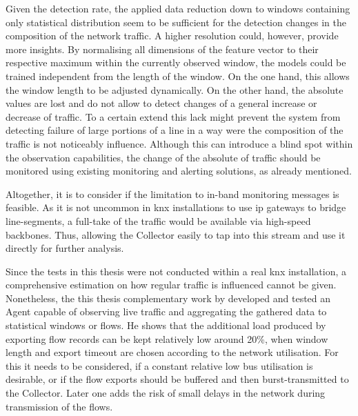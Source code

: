 Given the detection rate, the applied data reduction down to windows containing only statistical distribution seem to be sufficient for the detection changes in the composition of the network traffic. A higher resolution could, however, provide more insights.
By normalising all dimensions of the feature vector to their respective maximum within the currently observed window, the models could be trained independent from the length of the window. On the one hand, this allows the window length to be adjusted dynamically.
On the other hand, the absolute values are lost and do not allow to detect changes of a general increase or decrease of traffic. 
To a certain extend this lack might prevent the system from detecting failure of large portions of a line in a way were the composition of the traffic is not noticeably influence.
Although this can introduce a blind spot within the observation capabilities, the change of the absolute of traffic should be monitored using existing monitoring and alerting solutions, as already mentioned.

Altogether, it is to consider if the limitation to in-band monitoring messages is feasible. As it is not uncommon in \gls{knx} installations to use \gls{ip} gateways to bridge line-segments, a full-take of the traffic would be available via high-speed backbones. Thus, allowing the Collector easily to tap into this stream and use it directly for further analysis.

Since the tests in this thesis were not conducted within a real \gls{knx} installation, a comprehensive estimation on how regular traffic is influenced cannot be given.
Nonetheless, the this thesis complementary work by \textcite{Jung2018} developed and tested an Agent capable of observing live traffic and aggregating the gathered data to statistical windows or flows.
He shows that the additional load produced by exporting flow records can be kept relatively low around 20\%, when window length and export timeout are chosen according to the network utilisation.
For this it needs to be considered, if a constant relative low bus utilisation is desirable, or if the flow exports should be buffered and then burst-transmitted to the Collector. Later one adds the risk of small delays in the network during transmission of the flows.

